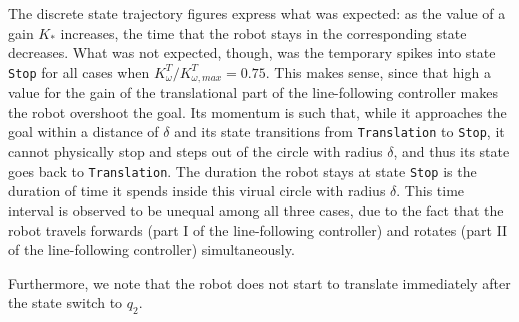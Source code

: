 The discrete state trajectory figures express what was expected: as the value
of a gain $K_{*}$ increases, the time that the robot stays in the corresponding
state decreases. What was not expected, though, was the temporary spikes into
state \texttt{Stop} for all cases when $K_{\omega}^T / K_{\omega,max}^T = 0.75$.
This makes sense, since that high a value for the gain of the translational
part of the line-following controller makes the robot overshoot the goal. Its
momentum is such that, while it approaches the goal within a distance of $\delta$
and its state transitions from \texttt{Translation} to \texttt{Stop}, it cannot
physically stop and steps out of the circle with radius $\delta$, and thus its
state goes back to \texttt{Translation}. The duration the robot stays at state
\texttt{Stop} is the duration of time it spends inside this virual circle with
radius $\delta$.  This time interval is observed to be unequal among all three
cases, due to the fact that the robot travels forwards (part I of the
line-following controller) and rotates (part II of the line-following
controller) simultaneously.

Furthermore, we note that the robot does not start to translate immediately after
the state switch to $q_2$.


\begin{figure}[H]
\begin{multicols}{2}
\quad
{}

\quad
{}

\quad
{}

\end{multicols}
\caption{}
\label{multifig:19_1}
\end{figure}

